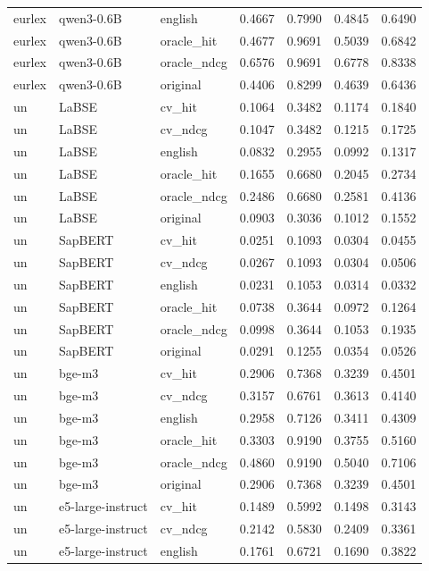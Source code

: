 \begin{tabular}{lllrrrr}
eurlex & qwen3-0.6B & english & 0.4667 & 0.7990 & 0.4845 & 0.6490 \\
eurlex & qwen3-0.6B & oracle\_hit & 0.4677 & 0.9691 & 0.5039 & 0.6842 \\
eurlex & qwen3-0.6B & oracle\_ndcg & 0.6576 & 0.9691 & 0.6778 & 0.8338 \\
eurlex & qwen3-0.6B & original & 0.4406 & 0.8299 & 0.4639 & 0.6436 \\
un & LaBSE & cv\_hit & 0.1064 & 0.3482 & 0.1174 & 0.1840 \\
un & LaBSE & cv\_ndcg & 0.1047 & 0.3482 & 0.1215 & 0.1725 \\
un & LaBSE & english & 0.0832 & 0.2955 & 0.0992 & 0.1317 \\
un & LaBSE & oracle\_hit & 0.1655 & 0.6680 & 0.2045 & 0.2734 \\
un & LaBSE & oracle\_ndcg & 0.2486 & 0.6680 & 0.2581 & 0.4136 \\
un & LaBSE & original & 0.0903 & 0.3036 & 0.1012 & 0.1552 \\
un & SapBERT & cv\_hit & 0.0251 & 0.1093 & 0.0304 & 0.0455 \\
un & SapBERT & cv\_ndcg & 0.0267 & 0.1093 & 0.0304 & 0.0506 \\
un & SapBERT & english & 0.0231 & 0.1053 & 0.0314 & 0.0332 \\
un & SapBERT & oracle\_hit & 0.0738 & 0.3644 & 0.0972 & 0.1264 \\
un & SapBERT & oracle\_ndcg & 0.0998 & 0.3644 & 0.1053 & 0.1935 \\
un & SapBERT & original & 0.0291 & 0.1255 & 0.0354 & 0.0526 \\
un & bge-m3 & cv\_hit & 0.2906 & 0.7368 & 0.3239 & 0.4501 \\
un & bge-m3 & cv\_ndcg & 0.3157 & 0.6761 & 0.3613 & 0.4140 \\
un & bge-m3 & english & 0.2958 & 0.7126 & 0.3411 & 0.4309 \\
un & bge-m3 & oracle\_hit & 0.3303 & 0.9190 & 0.3755 & 0.5160 \\
un & bge-m3 & oracle\_ndcg & 0.4860 & 0.9190 & 0.5040 & 0.7106 \\
un & bge-m3 & original & 0.2906 & 0.7368 & 0.3239 & 0.4501 \\
un & e5-large-instruct & cv\_hit & 0.1489 & 0.5992 & 0.1498 & 0.3143 \\
un & e5-large-instruct & cv\_ndcg & 0.2142 & 0.5830 & 0.2409 & 0.3361 \\
un & e5-large-instruct & english & 0.1761 & 0.6721 & 0.1690 & 0.3822 \\

\end{tabular}

